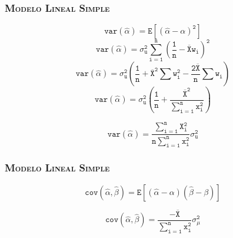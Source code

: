 \documentclass[16.5pt]{beamer}
\begin{document}
{
\begin{frame}
\frametitle{\textsc{Modelo Lineal Simple}}
\hspace*{-5mm}
\vspace*{-5mm} 


$$\mathtt{ var(\hat\alpha)= E[(\hat\alpha-\alpha)^2]} $$
$$\mathtt{ var(\hat\alpha)= \sigma_u^2\sum_{i=1}^n(\frac{1}{n}-\overline{X}w_i)^2} $$
$$\mathtt{ var(\hat\alpha)= \sigma_u^2(\frac{1}{n}+ \overline{X}^2\sum w_i^2 - \frac{2\overline{X}}{n}\sum w_i)} $$
$$\mathtt{ var(\hat\alpha)= \sigma_u^2(\frac{1}{n}+ \frac{\overline{X}^2}{\sum_{i=1}^n x_i^2})} $$

$$\mathtt{\boxed{ var(\hat\alpha)= \frac{\sum_{i=1}^nX_i^2}{n\sum_{i=1}^n x_i^2}\sigma_u^2}} $$

\end{frame}
}
{
\begin{frame}
\frametitle{\textsc{Modelo Lineal Simple}}
\hspace*{-5mm}
\vspace*{-5mm} 


$$\mathtt{ cov(\hat{\alpha}, \hat{\beta})= E[(\hat{\alpha}-\alpha)(\hat\beta - \beta)]} $$

$$\mathtt{ \boxed{cov(\hat{\alpha}, \hat{\beta})=  \frac{-\overline{X}}{\sum_{i=1}^n x_i^2}\sigma_{\mu}^2}} $$


\end{frame}
}
\end{document}
